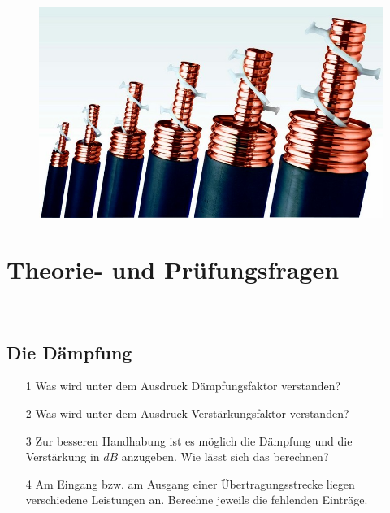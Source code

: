 \begin{figure}
 \vspace{-6cm}
  \includegraphics[scale=0.2]{DDK/Bilder/Cables.jpg}
 \vspace{-6cm}
\end{figure}

\section*{Theorie- und Prüfungsfragen}

~~~~~~
\subsection*{Die Dämpfung}

\begin{enumerate} 
\itemsep1pt\parskip0pt
\item[1] Was wird unter dem Ausdruck Dämpfungsfaktor verstanden?
\item[2] Was wird unter dem Ausdruck Verstärkungsfaktor verstanden?
\item[3] Zur besseren Handhabung ist es möglich die Dämpfung und die Verstärkung in $dB$ anzugeben. Wie lässt sich das berechnen?
\item[4] Am Eingang bzw. am Ausgang einer Übertragungsstrecke liegen verschiedene Leistungen an. Berechne jeweils die fehlenden Einträge.
\end{enumerate}


